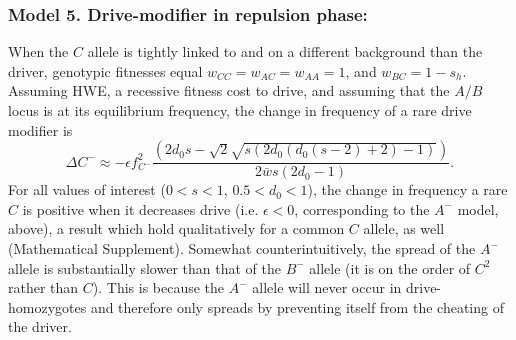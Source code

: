 \documentclass[12pt,letterpaper]{article}
\newcommand{\yb}[1]{{ \color{blue} #1}}
\begin{document}
\subsubsection*{Model 5. Drive-modifier in repulsion phase:}
When the $C$ allele is tightly linked to and on a different background than the driver, 
	genotypic fitnesses equal $w_{CC}=w_{AC}=w_{AA}=1$, and $w_{BC}=1-s_h$. 
Assuming HWE, a recessive fitness cost to drive, and assuming that the $A/B$ locus is at its equilibrium frequency, the change in frequency of a rare drive modifier is
\begin{equation}
	\Delta C^- \approx -\epsilon f_{C^-}^2 \frac{ \left(2 d_0 s-\sqrt{2} \sqrt{s (2 d_0 (d_0 (s-2)+2)-1)}\right)}{2\bar{w}s (2 d_0 -1) }. \label{A-}
\end{equation}
For all values of interest ($0<s<1$, $0.5<d_0<1$), the change in frequency a rare $C$ is positive when it decreases drive (i.e. $\epsilon <0$, corresponding to the $A^-$ model, above), a result which hold qualitatively for a common $C$ allele, as well (Mathematical Supplement). 
Somewhat counterintuitively, the spread of the $A^-$ allele is substantially slower than that of the $B^-$ allele (it is on the order of $C^{2}$ rather than $C$). 
This is because the $A^-$ allele will never occur in drive-homozygotes and therefore only spreads by preventing itself from the cheating of the driver.
\end{document}
